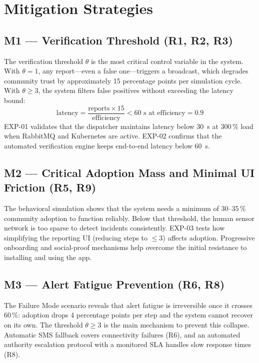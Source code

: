 \documentclass[conference,a4paper,10pt]{IEEEtran}
\begin{document}
\section{Mitigation Strategies}

\subsection{M1 --- Verification Threshold (R1, R2, R3)}

The verification threshold $\theta$ is the most critical control
variable in the system. With $\theta = 1$, any report---even a
false one---triggers a broadcast, which degrades community trust by
approximately 15 percentage points per simulation cycle. With
$\theta \geq 3$, the system filters false positives without
exceeding the latency bound:
\[
\text{latency} = \frac{\text{reports} \times 15}{\text{efficiency}}
< 60\text{ s at efficiency} = 0.9
\]
EXP-01 validates that the dispatcher maintains latency below 30~s
at 300\,\% load when RabbitMQ and Kubernetes are active. EXP-02
confirms that the automated verification engine keeps end-to-end
latency below 60~s.

\subsection{M2 --- Critical Adoption Mass and Minimal UI Friction
  (R5, R9)}

The behavioral simulation shows that the system needs a minimum of
30--35\,\% community adoption to function reliably. Below that
threshold, the human sensor network is too sparse to detect incidents
consistently. EXP-03 tests how simplifying the reporting UI (reducing
steps to $\leq 3$) affects adoption. Progressive onboarding and
social-proof mechanisms help overcome the initial resistance to
installing and using the app.

\subsection{M3 --- Alert Fatigue Prevention (R6, R8)}

The Failure Mode scenario reveals that alert fatigue is irreversible
once it crosses 60\,\%: adoption drops 4 percentage points per
step and the system cannot recover on its own. The threshold
$\theta \geq 3$ is the main mechanism to prevent this collapse.
Automatic SMS fallback covers connectivity failures (R6), and an
automated authority escalation protocol with a monitored SLA
handles slow response times (R8).
\end{document}
